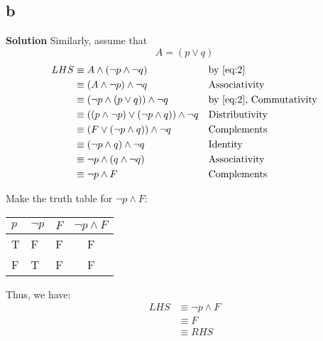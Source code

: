 \subsection{b}
\textbf{Solution}
Similarly, assume that
\begin{equation}
\label{eq:2}
  A = (p \lor q)
\end{equation}
\begin{align*}
  LHS
  & \equiv A \land (\neg p \land \neg q)
  && \text{by \eqref{eq:2}} \\
  & \equiv (A \land \neg p) \land \neg q
  && \text{Associativity} \\
  & \equiv (\neg p \land (p \lor q)) \land \neg q
  && \text{by \eqref{eq:2}, Commutativity} \\
  & \equiv ((p \land \neg p) \lor (\neg p \land q)) \land \neg q
  && \text{Distributivity} \\
  & \equiv (F \lor (\neg p \land q)) \land \neg q
  && \text{Complements} \\
  & \equiv (\neg p \land q) \land \neg q
  && \text{Identity} \\
  & \equiv \neg p \land (q \land \neg q)
  && \text{Associativity}  \\
  & \equiv \neg p \land F && \text{Complements}
\end{align*}

Make the truth table for \(\neg p \land F\):
\begin{center}
\begin{tabular}{|l|l|l|c|}
  \hline
  \(p\) & \(\neg p\) & \(F\) & \(\neg p \land F\) \\
  \hline
  T & F & F & F \\
  F & T & F & F \\
  \hline
\end{tabular}
\end{center}
Thus, we have:
\begin{align*}
  LHS
  & \equiv \neg p \land F \\
  & \equiv F \\
  & \equiv RHS
\end{align*}

